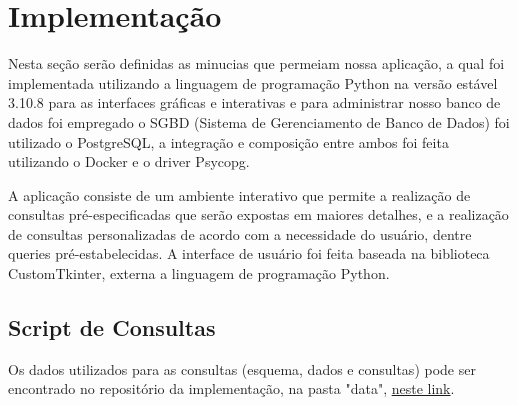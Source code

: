 \section{Implementação}
Nesta seção serão definidas as minucias que permeiam nossa aplicação, a qual foi implementada utilizando a linguagem de programação Python na versão estável 3.10.8 para as interfaces gráficas e interativas e para administrar nosso banco de dados foi empregado o SGBD (Sistema de Gerenciamento de Banco de Dados) foi utilizado o PostgreSQL, a integração e composição entre ambos foi feita utilizando o Docker e o driver Psycopg.

A aplicação consiste de um ambiente interativo que permite a realização de consultas pré-especificadas que serão expostas em maiores detalhes, e a realização de consultas personalizadas de acordo com a necessidade do usuário, dentre queries pré-estabelecidas. A interface de usuário foi feita baseada na biblioteca CustomTkinter, externa a linguagem de programação Python.
\subsection{Script de Consultas}

Os dados utilizados para as consultas (esquema, dados e consultas) pode ser encontrado no repositório da implementação, na pasta "data", \href{https://github.com/Franreno/AuxilioDepQuim/tree/main/data}{neste link}.


